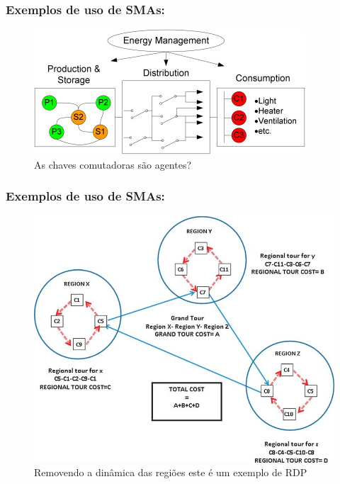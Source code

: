 \begin{frame} %

  \frametitle{Exemplos de uso de SMAs:}
        
\begin{figure}[!ht]
\centering
\includegraphics[height =.6\textheight,width=.7\textwidth]{figuras/example_SMAs02.jpg}
\caption{As chaves comutadoras são agentes?}
\end{figure}
    
\end{frame}

\begin{frame} %

  \frametitle{Exemplos de uso de SMAs:}
        
\begin{figure}[!ht]
\centering
\includegraphics[height =.6\textheight,width=.7\textwidth]{figuras/example_SMAs03.jpg}
\caption{Removendo a dinâmica das regiões este é um exemplo de RDP}
\end{figure}
    
\end{frame}


